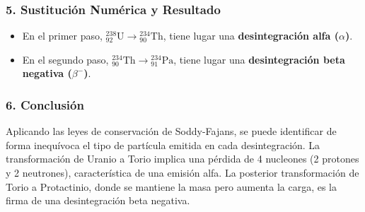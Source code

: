 \subsubsection*{5. Sustitución Numérica y Resultado}
\begin{cajaresultado}
\begin{itemize}
    \item En el primer paso, ${}_{92}^{238}\text{U} \to {}_{90}^{234}\text{Th}$, tiene lugar una \textbf{desintegración alfa ($\alpha$)}.
    \item En el segundo paso, ${}_{90}^{234}\text{Th} \to {}_{91}^{234}\text{Pa}$, tiene lugar una \textbf{desintegración beta negativa ($\beta^-$)}.
\end{itemize}
\end{cajaresultado}

\subsubsection*{6. Conclusión}
\begin{cajaconclusion}
Aplicando las leyes de conservación de Soddy-Fajans, se puede identificar de forma inequívoca el tipo de partícula emitida en cada desintegración. La transformación de Uranio a Torio implica una pérdida de 4 nucleones (2 protones y 2 neutrones), característica de una emisión alfa. La posterior transformación de Torio a Protactinio, donde se mantiene la masa pero aumenta la carga, es la firma de una desintegración beta negativa.
\end{cajaconclusion}

\newpage